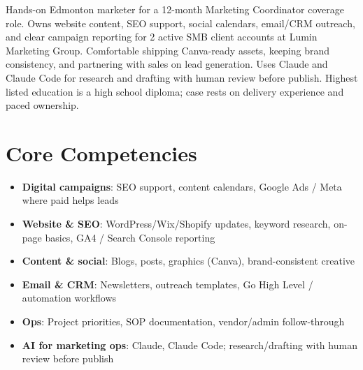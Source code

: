 \documentclass[11pt,a4paper,sans]{moderncv}
\begin{document}
\makecvtitle

\vspace{6pt}
\small{Hands-on Edmonton marketer for a 12-month Marketing Coordinator coverage role. Owns website content, SEO support, social calendars, email/CRM outreach, and clear campaign reporting for 2 active SMB client accounts at Lumin Marketing Group. Comfortable shipping Canva-ready assets, keeping brand consistency, and partnering with sales on lead generation. Uses Claude and Claude Code for research and drafting with human review before publish. Highest listed education is a high school diploma; case rests on delivery experience and paced ownership.}

\section{Core Competencies}
\vspace{1pt}
\begin{itemize}
\item \textbf{Digital campaigns}: SEO support, content calendars, Google Ads / Meta where paid helps leads
\item \textbf{Website \& SEO}: WordPress/Wix/Shopify updates, keyword research, on-page basics, GA4 / Search Console reporting
\item \textbf{Content \& social}: Blogs, posts, graphics (Canva), brand-consistent creative
\item \textbf{Email \& CRM}: Newsletters, outreach templates, Go High Level / automation workflows
\item \textbf{Ops}: Project priorities, SOP documentation, vendor/admin follow-through
\item \textbf{AI for marketing ops}: Claude, Claude Code; research/drafting with human review before publish
\end{itemize}
\end{document}
